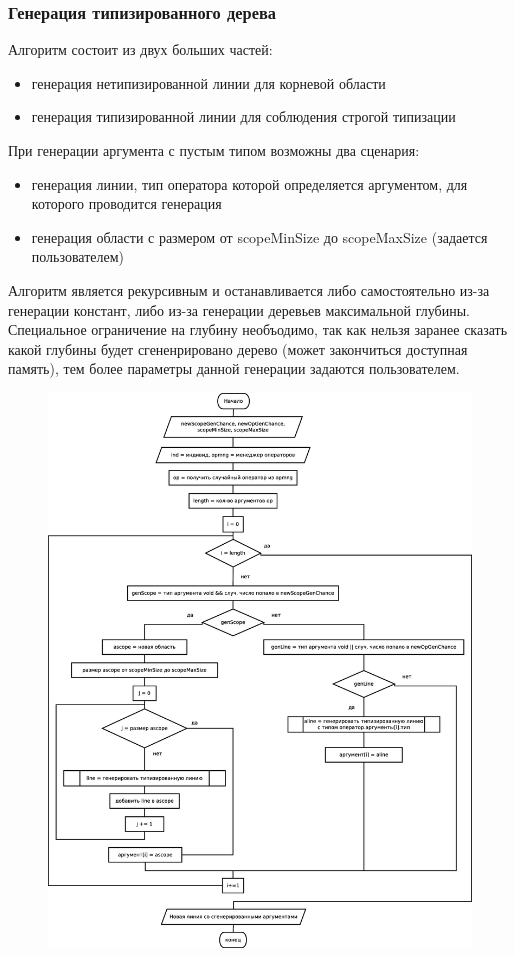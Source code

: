 \documentclass[russian,utf8,emptystyle]{eskdtext}
\begin{document}
\begin{spacing}{1.5}
\subsubsection{Генерация типизированного дерева}
Алгоритм состоит из двух больших частей:
\begin{itemize}
\item генерация нетипизированной линии для корневой области
\item генерация типизированной линии для соблюдения строгой типизации
\end{itemize}
При генерации аргумента с пустым типом возможны два сценария:
\begin{itemize}
\item генерация линии, тип оператора которой определяется аргументом, для которого проводится генерация
\item генерация области с размером от scopeMinSize до scopeMaxSize (задается пользователем)
\end{itemize}
Алгоритм является рекурсивным и останавливается либо самостоятельно из-за генерации констант, либо из-за генерации деревьев максимальной глубины. Специальное ограничение на глубину необъодимо, так как нельзя заранее сказать какой глубины будет сгененрировано дерево (может закончиться доступная память), тем более параметры данной генерации задаются пользователем.

\clearpage
\begin{figure}[h!]
\centering
\includegraphics[width=1.0\textwidth]{generate_line_alg.eps}
\end{figure}


\end{spacing}
\end{document}
